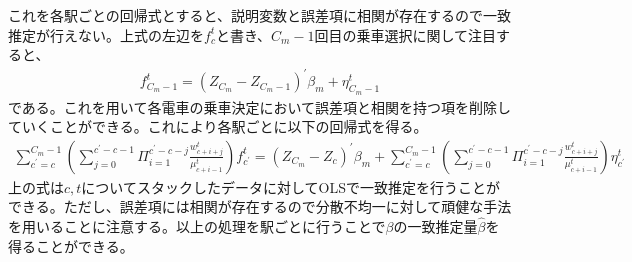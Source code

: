 \documentclass{jsarticle}
\begin{document}
これを各駅ごとの回帰式とすると、説明変数と誤差項に相関が存在するので一致推定が行えない。上式の左辺を$f_c^t$と書き、$C_m-1$回目の乗車選択に関して注目すると、
\begin{align*}
	f_{C_m-1}^t = \left( Z_{C_m} - Z_{C_m-1} \right)^{'} \beta_m + \eta_{C_m-1}^t
\end{align*}
である。これを用いて各電車の乗車決定において誤差項と相関を持つ項を削除していくことができる。これにより各駅ごとに以下の回帰式を得る。
\begin{align*}
	\sum_{c^{'} = c}^{C_m-1} \left( \sum_{j = 0}^{c^{'} -c -1} \Pi_{i = 1}^{c^{'} - c-j} \frac{w_{c+i+j}^t}{\mu_{c + i-1}^t} \right) f_{c^{'}}^t = (Z_{C_m} - Z_c)^{'} \beta_m + \sum_{c^{'} = c}^{C_m-1} \left( \sum_{j = 0}^{c^{'} -c -1} \Pi_{i = 1}^{c^{'} - c-j} \frac{w_{c+i+j}^t}{\mu_{c + i-1}^t} \right) \eta_{c^{'}}^t
\end{align*}
上の式は$c,t$についてスタックしたデータに対してOLSで一致推定を行うことができる。ただし、誤差項には相関が存在するので分散不均一に対して頑健な手法を用いることに注意する。以上の処理を駅ごとに行うことで$\beta$の一致推定量$\hat{\beta}$を得ることができる。
\end{document}
